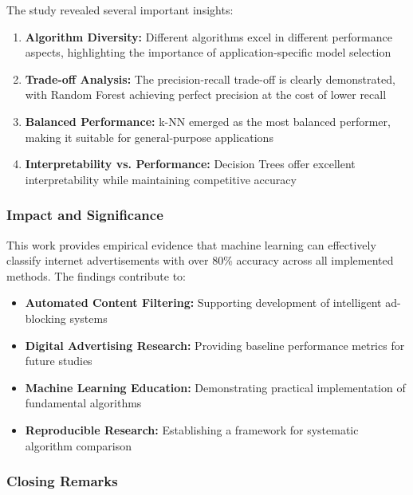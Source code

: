 The study revealed several important insights:

\begin{enumerate}
    \item \textbf{Algorithm Diversity:} Different algorithms excel in different performance aspects, highlighting the importance of application-specific model selection
    
    \item \textbf{Trade-off Analysis:} The precision-recall trade-off is clearly demonstrated, with Random Forest achieving perfect precision at the cost of lower recall
    
    \item \textbf{Balanced Performance:} k-NN emerged as the most balanced performer, making it suitable for general-purpose applications
    
    \item \textbf{Interpretability vs. Performance:} Decision Trees offer excellent interpretability while maintaining competitive accuracy
\end{enumerate}

\subsubsection{Impact and Significance}

This work provides empirical evidence that machine learning can effectively classify internet advertisements with over 80\% accuracy across all implemented methods. The findings contribute to:

\begin{itemize}
    \item \textbf{Automated Content Filtering:} Supporting development of intelligent ad-blocking systems
    \item \textbf{Digital Advertising Research:} Providing baseline performance metrics for future studies
    \item \textbf{Machine Learning Education:} Demonstrating practical implementation of fundamental algorithms
    \item \textbf{Reproducible Research:} Establishing a framework for systematic algorithm comparison
\end{itemize}

\subsubsection{Closing Remarks}


